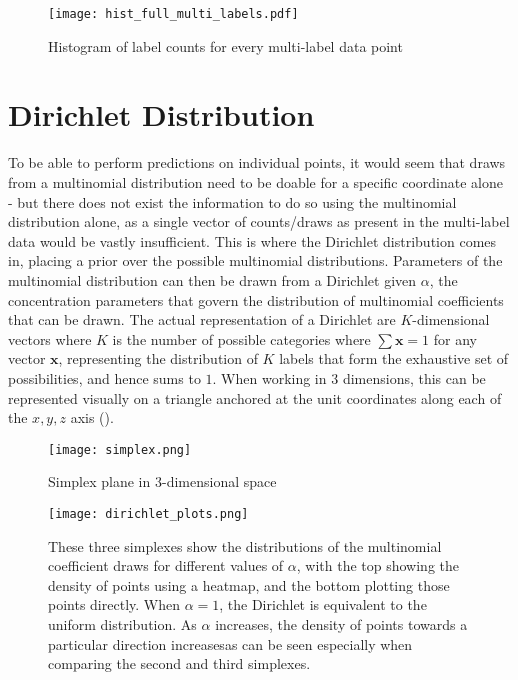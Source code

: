 \begin{figure}
    \texttt{[image: hist\_full\_multi\_labels.pdf]}
    \caption{Histogram of label counts for every multi-label data point}
    \label{fig:exhist}
\end{figure}

\section{Dirichlet Distribution}\label{chapsec:dirichlet}
To be able to perform predictions on individual points, it would seem that draws from a multinomial distribution need to be doable for a specific coordinate alone - but there does not exist the information to do so using the multinomial distribution alone, as a single vector of counts/draws as present in the multi-label data would be vastly insufficient. This is where the Dirichlet distribution comes in, placing a prior over the possible multinomial distributions. Parameters of the multinomial distribution can then be drawn from a Dirichlet given $\alpha$, the concentration parameters that govern the distribution of multinomial coefficients that can be drawn. The actual representation of a Dirichlet are $K$-dimensional vectors where $K$ is the number of possible categories where $\sum \mathbf{x} = 1$ for any vector $\mathbf{x}$, representing the distribution of $K$ labels that form the exhaustive set of possibilities, and hence sums to $1$. When working in $3$ dimensions, this can be represented visually on a triangle anchored at the unit coordinates along each of the $x, y, z$ axis ().

\begin{figure}
    \begin{minipage}{\linewidth}
        \centering
        \texttt{[image: simplex.png]}
        \caption*{Simplex plane in $3$-dimensional space}
    \end{minipage}
    \begin{minipage}{\linewidth}
        \texttt{[image: dirichlet\_plots.png]}
        \caption*{These three simplexes show the distributions of the multinomial coefficient draws for different values of $\alpha$, with the top showing the density of points using a heatmap, and the bottom plotting those points directly. When $\alpha=1$, the Dirichlet is equivalent to the uniform distribution. As $\alpha$ increases, the density of points towards a particular direction increasesas can be seen especially when comparing the second and third simplexes.}
    \end{minipage}
    \caption{}
    \label{fig:simplex}
\end{figure}

